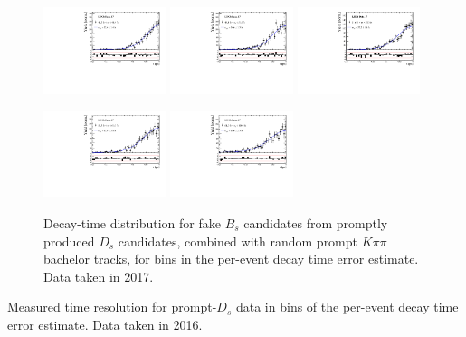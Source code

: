 \begin{figure}[h]
\includegraphics[height=!,width=0.32\textwidth]{figs/Resolution/SignalData_17_bin_7.pdf}
\includegraphics[height=!,width=0.32\textwidth]{figs/Resolution/SignalData_17_bin_8.pdf}
\includegraphics[height=!,width=0.32\textwidth]{figs/Resolution/SignalData_17_bin_9.pdf}

\includegraphics[height=!,width=0.32\textwidth]{figs/Resolution/SignalData_17_bin_10.pdf}
\includegraphics[height=!,width=0.32\textwidth]{figs/Resolution/SignalData_17_bin_11.pdf}

\caption{Decay-time distribution for fake $B_s$ candidates from promptly produced $D_s$ candidates, combined with random prompt $K\pi\pi$ bachelor tracks, for bins in the per-event decay time error estimate. Data taken in 2017.}
\label{fig:}
\end{figure}

\clearpage


\begin{table}[h]
\centering
\small
\caption{Measured time resolution for prompt-$D_s$ data in bins of the per-event decay time error estimate. Data taken in 2016.}

\label{table:ResoParamsData_16}
\end{table}

